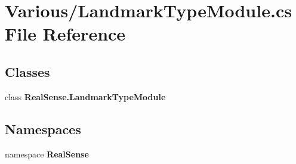\section{Various/\+Landmark\+Type\+Module.cs File Reference}
\label{_landmark_type_module_8cs}
\subsection*{Classes}
\begin{DoxyCompactItemize}
\item 
class \textbf{ Real\+Sense.\+Landmark\+Type\+Module}
\end{DoxyCompactItemize}
\subsection*{Namespaces}
\begin{DoxyCompactItemize}
\item 
namespace \textbf{ Real\+Sense}
\end{DoxyCompactItemize}
